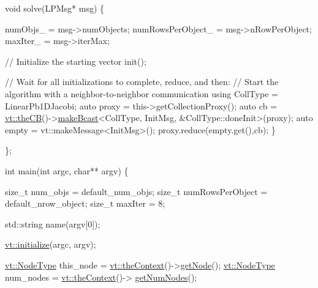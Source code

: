 \begin{DoxyCodeInclude}
  \textcolor{keywordtype}{void} solve(LPMsg* msg) \{

    numObjs\_ = msg->numObjects;
    numRowsPerObject\_ = msg->nRowPerObject;
    maxIter\_ = msg->iterMax;

    \textcolor{comment}{// Initialize the starting vector}
    init();

    \textcolor{comment}{// Wait for all initializations to complete, reduce, and then:}
    \textcolor{comment}{// Start the algorithm with a neighbor-to-neighbor communication}
    \textcolor{keyword}{using} CollType = LinearPb1DJacobi;
    \textcolor{keyword}{auto} proxy = this->getCollectionProxy();
    \textcolor{keyword}{auto} cb = \hyperlink{namespacevt_a673b109e94c7bca58313504c83e1da94}{vt::theCB}()->\hyperlink{structvt_1_1pipe_1_1_pipe_manager_a2ea6bd5ea3e001662681b1e5a1971e9d}{makeBcast}<CollType, InitMsg, &CollType::doneInit>(proxy);
    \textcolor{keyword}{auto} empty = vt::makeMessage<InitMsg>();
    proxy.reduce(empty.get(),cb);
  \}

\};


\textcolor{keywordtype}{int} main(\textcolor{keywordtype}{int} argc, \textcolor{keywordtype}{char}** argv) \{

  \textcolor{keywordtype}{size\_t} num\_objs = default\_num\_objs;
  \textcolor{keywordtype}{size\_t} numRowsPerObject = default\_nrow\_object;
  \textcolor{keywordtype}{size\_t} maxIter = 8;

  std::string name(argv[0]);

  \hyperlink{namespacevt_aaa266774ea8339c58be0202b00fafa62}{vt::initialize}(argc, argv);

  \hyperlink{namespacevt_a866da9d0efc19c0a1ce79e9e492f47e2}{vt::NodeType} this\_node = \hyperlink{namespacevt_a26551fe0e6e6a1371111df5b12c7e92c}{vt::theContext}()->\hyperlink{structvt_1_1ctx_1_1_context_a0d52c263ce8516546a67443d9a86fa5f}{getNode}();
  \hyperlink{namespacevt_a866da9d0efc19c0a1ce79e9e492f47e2}{vt::NodeType} num\_nodes = \hyperlink{namespacevt_a26551fe0e6e6a1371111df5b12c7e92c}{vt::theContext}()->
      \hyperlink{structvt_1_1ctx_1_1_context_a7f41071aadf6d5fa9e1b6c703c5ff19d}{getNumNodes}();


\end{DoxyCodeInclude}
